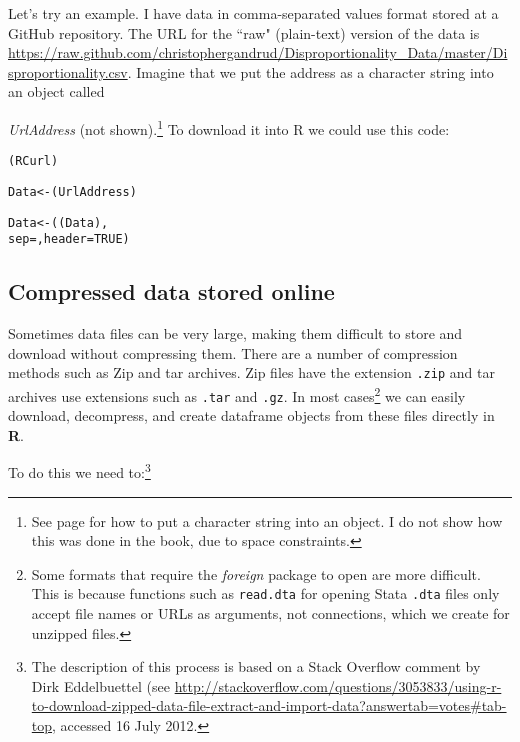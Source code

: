 Let's try an example. I have data in comma-separated values format stored at a GitHub repository. The URL for the ``raw" (plain-text) version of the data is \url{https://raw.github.com/christophergandrud/Disproportionality_Data/master/Disproportionality.csv}. Imagine that we put the address as a character string into an object called {\emph{UrlAddress} (not shown).\footnote{See page \pageref{Objects} for how to put a character string into an object. I do not show how this was done in the book, due to space constraints.}
To download it into R we could use this code:




\begin{knitrout}
\color{fgcolor}\begin{kframe}
\begin{alltt}
(RCurl)

Data <- (UrlAddress)

Data <- ((Data), 
                    sep = , header = TRUE)
\end{alltt}
\end{kframe}
\end{knitrout}


\subsection{Compressed data stored online}

Sometimes data files can be very large, making them difficult to store and download without compressing them. There are a number of compression methods such as Zip and tar archives. Zip files have the extension {\tt{.zip}} and tar archives use extensions such as {\tt{.tar}} and {\tt{.gz}}. In most cases\footnote{Some formats that require the {\emph{foreign}} package to open are more difficult. This is because functions such as {\tt{read.dta}} for opening Stata {\tt{.dta}} files only accept file names or URLs as arguments, not connections, which we create for unzipped files.} we can easily download, decompress, and create dataframe objects from these files directly in {\bf{R}}. 

To do this we need to:\footnote{The description of this process is based on a Stack Overflow comment by Dirk Eddelbuettel (see {\url{http://stackoverflow.com/questions/3053833/using-r-to-download-zipped-data-file-extract-and-import-data?answertab=votes\#tab-top}}, accessed 16 July 2012.}

}
